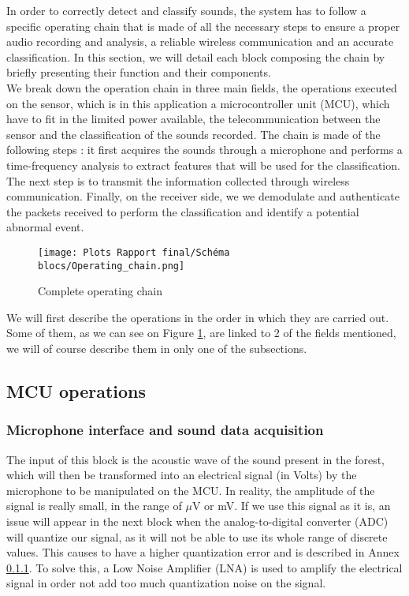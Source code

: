 \documentclass{article}
\begin{document}
In order to correctly detect and classify sounds, the system has to follow a specific operating chain that is made of all the necessary steps to ensure a proper audio recording and analysis, a reliable wireless communication and an accurate classification. In this section, we will detail each block composing the chain by briefly presenting their function and their components.  \\

We break down the operation chain in three main fields, the operations executed on the sensor, which is in this application a microcontroller unit (MCU), which have to fit in the limited power available, the telecommunication between the sensor and the classification of the sounds recorded. The chain is made of the following steps : it first acquires the sounds through a microphone and performs a time-frequency analysis to extract features that will be used for the classification. The next step is to transmit the information collected through wireless communication. Finally, on the receiver side, we we demodulate and authenticate the packets received to perform the classification and identify a potential abnormal event.

\begin{figure}[H] %
    \centering
    \texttt{[image: Plots Rapport final/Schéma blocs/Operating\_chain.png]}
    \caption{Complete operating chain}
    \label{Complete operating chain}
\end{figure}

We will first describe the operations in the order in which they are carried out. Some of them, as we can see on Figure \ref{Complete operating chain}, are linked to 2 of the fields mentioned, we will of course describe them in only one of the subsections. 

\subsection{MCU operations}

\subsubsection{Microphone interface and sound data acquisition}

The input of this block is the acoustic wave of the sound present in the forest, which will then be transformed into an electrical signal (in Volts) by the microphone to be manipulated on the MCU.
In reality, the amplitude of the signal is really small, in the range of $\mu\text{V}$ or mV. If we use this signal as it is, an issue will appear in the next block when the analog-to-digital converter (ADC) will quantize our signal, as it will not be able to use its whole range of discrete values. This causes to have a higher quantization error and is described in Annex \ref{}. 
To solve this, a Low Noise Amplifier (LNA) is used to amplify the electrical signal in order not add too much quantization noise on the signal. \\
\end{document}
